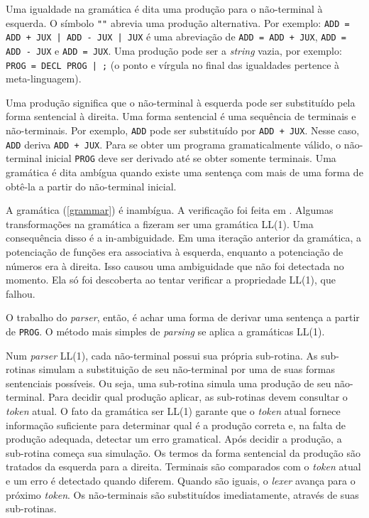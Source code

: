 Uma igualdade na gramática é dita uma produção para o não-terminal à esquerda.
O símbolo \texttt{"\textbar"}  abrevia uma produção alternativa. 
Por exemplo: \texttt{ADD = ADD + JUX | ADD - JUX | JUX}
é uma abreviação de \texttt{ADD = ADD + JUX},
\texttt{ADD = ADD - JUX} e \texttt{ADD = JUX}.
Uma produção pode ser a \textit{string} vazia, por exemplo: \texttt{PROG = DECL PROG | ;}
(o ponto e vírgula no final das igualdades pertence à meta-linguagem).

Uma produção significa que o não-terminal à esquerda pode ser substituído
pela forma sentencial à direita.
Uma forma sentencial é uma sequência de terminais e não-terminais.
Por exemplo, \texttt{ADD} pode ser substituído por \texttt{ADD + JUX}.
Nesse caso, \texttt{ADD} deriva \texttt{ADD + JUX}.
Para se obter um programa gramaticalmente válido,
o não-terminal inicial \texttt{PROG} deve ser derivado até se obter somente terminais.
Uma gramática é dita ambígua quando existe uma sentença com mais de uma forma de
obtê-la a partir do não-terminal inicial.

A gramática (\ref{grammar}) é inambígua.
A verificação foi feita em \cite{GramCheck}.
Algumas transformações na gramática a fizeram ser uma gramática LL(1).
Uma consequência disso é a in-ambiguidade.
Em uma iteração anterior da gramática, a potenciação de funções
era associativa à esquerda,
enquanto a potenciação de números era à direita.
Isso causou uma ambiguidade que não foi detectada no momento.
Ela só foi descoberta ao tentar verificar a propriedade LL(1), que falhou.

O trabalho do \textit{parser}, então, é achar uma forma de derivar uma
sentença a partir de \texttt{PROG}.
O método mais simples de \textit{parsing} se aplica a gramáticas LL(1).

Num \textit{parser} LL(1), cada não-terminal possui sua própria sub-rotina.
As sub-rotinas simulam a substituição de seu não-terminal
por uma de suas formas sentenciais possíveis.
Ou seja, uma sub-rotina simula uma produção de seu não-terminal.
Para decidir qual produção aplicar, as sub-rotinas devem consultar o \textit{token} atual.
O fato da gramática ser LL(1) garante que o \textit{token} atual fornece
informação suficiente para determinar qual é a produção correta e,
na falta de produção adequada,
detectar um erro gramatical. Após decidir a produção,
a sub-rotina começa sua simulação.
Os termos da forma sentencial da produção são tratados da esquerda para a direita.
Terminais são comparados com o \textit{token} atual e um erro é detectado quando diferem.
Quando são iguais, o \textit{lexer} avança para o próximo \textit{token}.
Os não-terminais são substituídos imediatamente, através de suas sub-rotinas.

